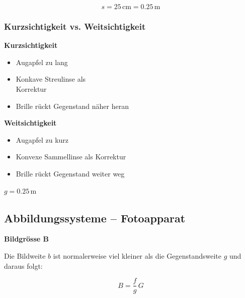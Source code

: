 $$ \boxed{ s = 25 \, \mathrm{cm} = 0.25 \, \mathrm{m}  } $$ 


\subsubsection{Kurzsichtigkeit vs. Weitsichtigkeit}

\begin{minipage}{0.48\columnwidth}
    \raggedright
    \textbf{Kurzsichtigkeit} 

    \begin{itemize}
        \item Augapfel zu lang
        \item Konkave Streulinse als\\
            Korrektur
        \item Brille rückt Gegenstand näher heran 
    \end{itemize}

    \medskip
    \centering
    
\end{minipage}
\hfill
\begin{minipage}{0.49\columnwidth}
    \raggedright
    \textbf{Weitsichtigkeit}

    \begin{itemize}
        \item Augapfel zu kurz
        \item Konvexe Sammellinse als Korrektur
        \item Brille rückt Gegenstand weiter weg 
    \end{itemize}

    \medskip
    \centering
    

    \scriptsize $g=0.25\,$m

\end{minipage}


\subsection{Abbildungssysteme -- Fotoapparat}


\begin{minipage}{0.66\columnwidth}
    \textbf{Bildgrösse $\bm{B}$} 

    Die Bildweite $b$ ist normalerweise viel kleiner als die
    Gegenstandsweite $g$ und daraus folgt:
\end{minipage}
\hfill
\begin{minipage}{0.3\columnwidth}
    $$ \boxed{ B = \frac{f}{g} \, G }$$
\end{minipage}


